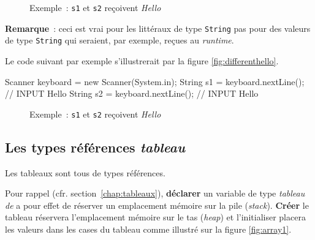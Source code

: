 \begin{figure}[h]
	\centering
	\caption{Exemple : \texttt{s1} et \texttt{s2} reçoivent \textit{Hello}}
	\label{fig:somehello}
\end{figure}

\textbf{Remarque}~: ceci est vrai pour les littéraux de type \texttt{String}
pas pour des valeurs de type \texttt{String} qui seraient, par exemple, reçues
au \textit{runtime}. 

Le code suivant par exemple s'illustrerait par la figure
\vref{fig:differenthello}. 

\begin{java}
	Scanner keyboard = new Scanner(System.in);
	String s1 = keyboard.nextLine();	// INPUT Hello
	String s2 = keyboard.nextLine();	// INPUT Hello
\end{java}

\begin{figure}[h]
	\centering
	\caption{Exemple : \texttt{s1} et \texttt{s2} reçoivent \textit{Hello}}
	\label{fig:differenthello}
\end{figure}





\subsection{Les types références \textit{tableau}}

Les tableaux sont tous de types références. 

Pour rappel (cfr. section~\vref{chap:tableaux}), \textbf{déclarer} un
variable de type \textit{tableau de} a pour effet de réserver un emplacement
mémoire sur la pile (\textit{stack}). \textbf{Créer} le tableau réservera
l'emplacement mémoire sur le tas (\textit{heap}) et l'initialiser placera les
valeurs dans les cases du tableau comme illustré sur la figure \vref{fig:array1}. 


